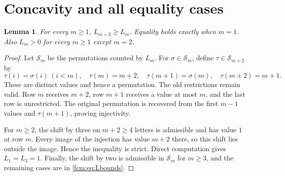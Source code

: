 \documentclass[11pt,letterpaper]{article}
\newtheorem{lemma}[theorem]{Lemma}
\theoremstyle{remark}\newtheorem{remark}[theorem]{Remark}
\begin{document}
\section{Concavity and all equality cases}
\begin{lemma}\label{fcm:lem:injection}
For every $m\ge1$, $L_{m+2}\ge L_m$. Equality holds exactly when $m=1$. Also $L_m>0$ for every $m\ge1$ except $m=2$.
\end{lemma}
\begin{proof}
Let $\mathcal S_m$ be the permutations counted by $L_m$. For $\sigma\in\mathcal S_m$, define $\tau\in\mathcal S_{m+2}$ by
\[
 \tau(i)=\sigma(i)\ (i<m),\quad
 \tau(m)=m+2,\quad \tau(m+1)=\sigma(m),\quad \tau(m+2)=m+1.
\]
These are distinct values and hence a permutation. The old restrictions remain valid. Row $m$ receives $m+2$, row $m+1$ receives a value at most $m$, and the last row is unrestricted. The original permutation is recovered from the first $m-1$ values and $\tau(m+1)$, proving injectivity.

For $m\ge2$, the shift by three on $m+2\ge4$ letters is admissible and has value $1$ at row $m$. Every image of the injection has value $m+2$ there, so this shift lies outside the image. Hence the inequality is strict. Direct computation gives $L_1=L_3=1$. Finally, the shift by two is admissible in $\mathcal S_m$ for $m\ge3$, and the remaining cases are in \eqref{fcm:eq:Lbounds}.
\end{proof}
\end{document}
